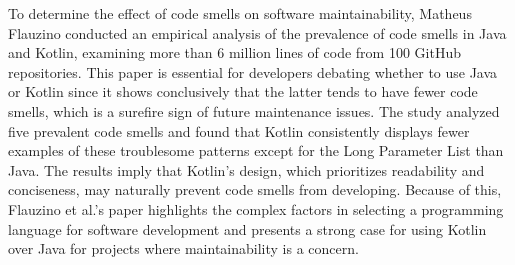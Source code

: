 To determine the effect of code smells on software maintainability, Matheus Flauzino conducted an empirical analysis of the prevalence of code smells in Java and Kotlin, examining more than 6 million lines of code from 100 GitHub repositories. This paper is essential for developers debating whether to use Java or Kotlin since it shows conclusively that the latter tends to have fewer code smells, which is a surefire sign of future maintenance issues. The study analyzed five prevalent code smells and found that Kotlin consistently displays fewer examples of these troublesome patterns except for the Long Parameter List than Java. The results imply that Kotlin's design, which prioritizes readability and conciseness, may naturally prevent code smells from developing. Because of this, Flauzino et al.'s paper highlights the complex factors in selecting a programming language for software development and presents a strong case for using Kotlin over Java for projects where maintainability is a concern\cite{flauzino2018you}. 

